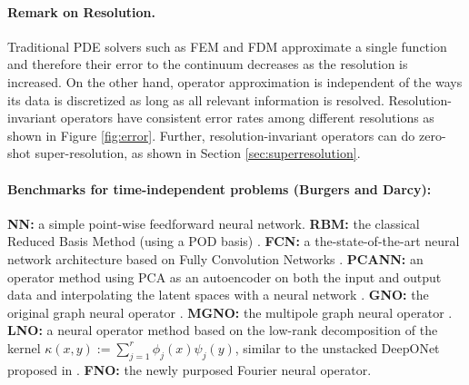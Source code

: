 \documentclass{article} %
\begin{document}
\paragraph{Remark on Resolution.}
Traditional PDE solvers such as FEM and FDM approximate a single function and therefore their error to the continuum decreases as the resolution is increased. On the other hand, operator approximation is independent of the ways its data is discretized as long as all relevant information is resolved. Resolution-invariant operators have consistent error rates among different resolutions as shown in Figure \ref{fig:error}. Further, resolution-invariant operators can do zero-shot super-resolution, as shown in Section \ref{sec:superresolution}.



\paragraph{Benchmarks for time-independent problems (Burgers and Darcy):}
{\bf NN:} a simple point-wise feedforward neural network. 
{\bf RBM:} the classical Reduced Basis Method (using a POD basis) \citep{DeVoreReducedBasis}. 
{\bf FCN:} a the-state-of-the-art neural network architecture based on Fully Convolution Networks \citep{Zabaras}. 
{\bf PCANN:} an operator method using PCA as an autoencoder on both the input and output data and interpolating the latent spaces with a neural network \citep{Kovachki}.   
{\bf GNO:} the original graph neural operator \citep{li2020neural}.
{\bf MGNO:} the multipole graph neural operator \citep{li2020multipole}.
{\bf LNO:} a neural operator method based on the low-rank decomposition of the kernel $\kappa(x,y) := \sum^r_{j=1} \phi_j(x) \psi_j(y)$, similar to the unstacked DeepONet  proposed in \citep{lu2019deeponet}.
{\bf FNO:} the newly purposed Fourier neural operator. 
\end{document}
